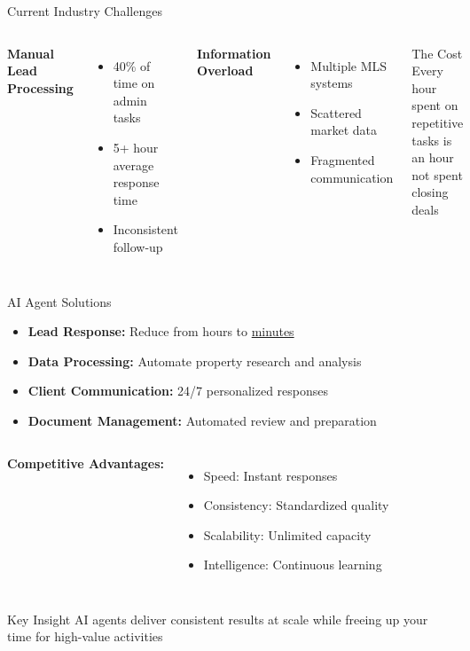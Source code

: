\documentclass{beamer}
\begin{document}
\begin{frame}{Current Industry Challenges}
  \begin{columns}[onlytextwidth]
      \textbf{Manual Lead Processing}
      \begin{itemize}
        \item 40\% of time on admin tasks
        \item 5+ hour average response time
        \item Inconsistent follow-up
      \end{itemize}
      
      \textbf{Information Overload}
      \begin{itemize}
        \item Multiple MLS systems
        \item Scattered market data
        \item Fragmented communication
      \end{itemize}
    
      \begin{block}{The Cost}
        Every hour spent on repetitive tasks is an hour not spent closing deals
      \end{block}
  \end{columns}
\end{frame}

\begin{frame}{AI Agent Solutions}
  \small
  \begin{itemize}
    \item \textbf{Lead Response:} Reduce from hours to \underline{minutes}
    \item \textbf{Data Processing:} Automate property research and analysis
    \item \textbf{Client Communication:} 24/7 personalized responses
    \item \textbf{Document Management:} Automated review and preparation
  \end{itemize}
  
  \vspace{0.3cm}
  
  \begin{columns}[onlytextwidth]
      \textbf{Competitive Advantages:}
      \begin{itemize}
        \item Speed: Instant responses
        \item Consistency: Standardized quality
        \item Scalability: Unlimited capacity
        \item Intelligence: Continuous learning
      \end{itemize}
  \end{columns}
  
  \vspace{0.3cm}
  \begin{block}{Key Insight}
    AI agents deliver consistent results at scale while freeing up your time for high-value activities
  \end{block}
\end{frame}
\end{document}
